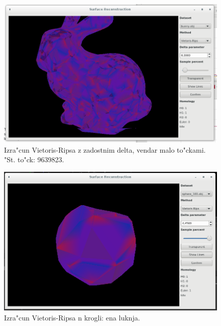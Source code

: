 \documentclass[11pt]{article}
\begin{document}
\begin{figure}[htb]
    \centering
    \includegraphics[width=1\textwidth]{vr_full_9639823.png}
    \caption{Izra"cun Vietoris-Ripsa z zadostnim delta, vendar malo to"ckami. "St. to"ck: 9639823.}
    \label{fig:vr2}
\end{figure}

\begin{figure}[htb]
    \centering
    \includegraphics[width=1\textwidth]{vr_1hole.png}
    \caption{Izra"cun Vietoris-Ripsa n krogli: ena luknja.}
    \label{fig:vr3}
\end{figure}
\end{document}
